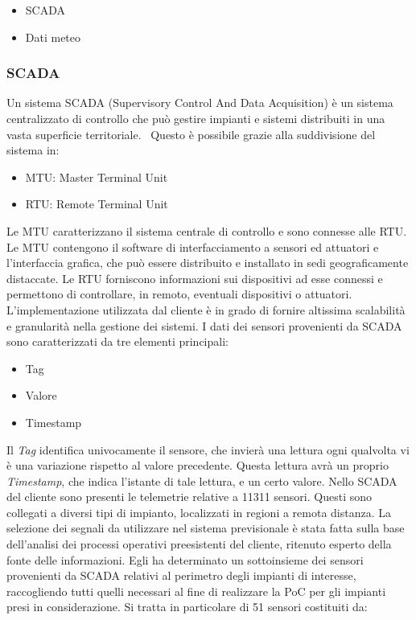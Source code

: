 \begin{itemize}
	\item SCADA
	\item Dati meteo
\end{itemize}

\subsubsection{SCADA}
Un sistema SCADA  (Supervisory Control And Data Acquisition) è un sistema centralizzato di controllo che può gestire impianti e sistemi distribuiti in una vasta superficie territoriale.~\cite{panzieri} Questo è possibile grazie alla suddivisione del sistema in:
\begin{itemize}
	\item MTU: Master Terminal Unit
	\item RTU: Remote Terminal Unit
\end{itemize}
Le MTU caratterizzano il sistema centrale di controllo e sono connesse alle RTU. Le MTU contengono il software di interfacciamento a sensori ed attuatori e l’interfaccia grafica, che può essere distribuito e installato in sedi geograficamente distaccate. Le RTU forniscono informazioni sui dispositivi ad esse connessi e permettono di controllare, in remoto, eventuali dispositivi o attuatori. L'implementazione utilizzata dal cliente è in grado di fornire altissima scalabilità e granularità nella gestione dei sistemi.
I dati dei sensori provenienti da SCADA sono caratterizzati da tre elementi principali:
\begin{itemize}
	\item Tag
	\item Valore
	\item Timestamp
\end{itemize}
Il \textit{Tag} identifica univocamente il sensore, che invierà una lettura ogni qualvolta vi è una variazione rispetto al valore precedente. Questa lettura avrà un proprio \textit{Timestamp}, che indica l’istante di tale lettura, e un certo valore.
Nello SCADA del cliente sono presenti le telemetrie relative a 11311 sensori. Questi sono collegati a diversi tipi di impianto, localizzati in regioni a remota distanza. La selezione dei segnali da utilizzare nel sistema previsionale è stata fatta sulla base dell'analisi dei processi operativi preesistenti del cliente, ritenuto esperto della fonte delle informazioni. Egli ha determinato un sottoinsieme dei sensori provenienti da SCADA relativi al perimetro degli impianti di interesse, raccogliendo tutti quelli necessari al fine di realizzare la PoC per gli impianti presi in considerazione. Si tratta in particolare di 51 sensori costituiti da:
